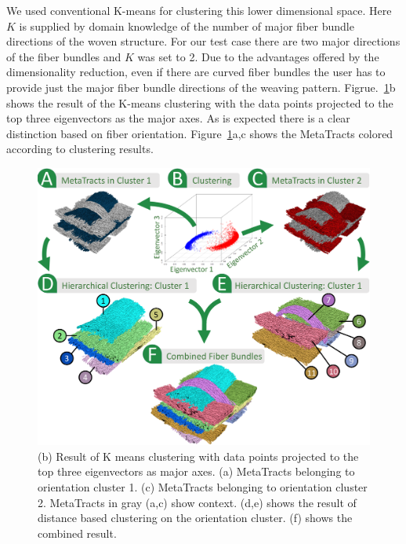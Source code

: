 %  
We used conventional K-means for clustering this lower dimensional space. Here $K$ is supplied by domain knowledge of the number of major fiber bundle directions of the woven structure.
For our test case there are two major directions of the fiber bundles and $K$ was set to 2. Due to the advantages offered by the dimensionality reduction, even if there are curved fiber bundles the user has to provide just the major fiber bundle directions of the weaving pattern. Figrue.~\ref{fig:orientation_clustering}b shows the result of the K-means clustering with the data points projected to the top three eigenvectors as the major axes. As is expected there is a clear distinction based on fiber orientation. Figure~\ref{fig:orientation_clustering}a,c shows the MetaTracts colored according to clustering results.


\begin{figure}[tb] 
  \centering  	
  \includegraphics[width=\linewidth]{images_pvis/clustering.pdf}
   \vspace{-1.5em}
  	\caption{(b) Result of K means clustering with data points projected to the top three eigenvectors as major axes. (a) MetaTracts belonging to orientation cluster 1. (c) MetaTracts belonging to orientation cluster 2. MetaTracts in gray (a,c) show context.
  	(d,e) shows the result of distance based clustering on the orientation cluster. (f) shows the combined result. }
  \label{fig:orientation_clustering}
  \end{figure}

